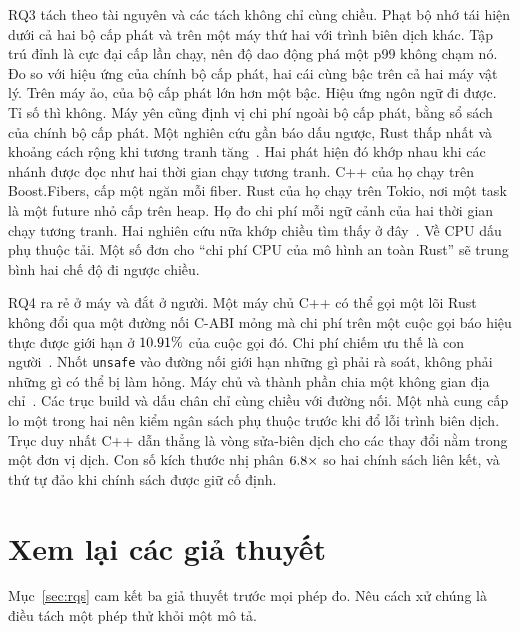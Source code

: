 RQ3 tách theo tài nguyên và các tách không chỉ cùng chiều. Phạt bộ nhớ tái hiện dưới cả hai bộ
cấp phát và trên một máy thứ hai với trình biên dịch khác. Tập trú đỉnh là cực đại cấp lần chạy,
nên độ dao động phá một p99 không chạm nó. Đo so với hiệu ứng của chính bộ cấp phát, hai cái
cùng bậc trên cả hai máy vật lý. Trên máy ảo, của bộ cấp phát lớn hơn một bậc. Hiệu ứng ngôn
ngữ đi được. Tỉ số thì không. Máy yên cũng định vị chi phí ngoài bộ cấp phát, bằng sổ sách của
chính bộ cấp phát. Một nghiên cứu gần báo dấu ngược, Rust thấp nhất và khoảng cách rộng khi
tương tranh tăng~\cite{karlback2021ran}. Hai phát hiện đó khớp nhau khi các nhánh được đọc như
hai thời gian chạy tương tranh. C++ của họ chạy trên Boost.Fibers, cấp một ngăn mỗi fiber. Rust
của họ chạy trên Tokio, nơi một task là một future nhỏ cấp trên heap. Họ đo chi phí mỗi ngữ cảnh
của hai thời gian chạy tương tranh. Hai nghiên cứu nữa khớp chiều tìm thấy ở
đây~\cite{olsson2023ranmgmt,sundvisson2026drivers}. Về CPU dấu phụ thuộc tải. Một số đơn cho
``chi phí CPU của mô hình an toàn Rust'' sẽ trung bình hai chế độ đi ngược chiều.

RQ4 ra rẻ ở máy và đắt ở người. Một máy chủ C++ có thể gọi một lõi Rust không đổi qua một đường
nối C-ABI mỏng mà chi phí trên một cuộc gọi báo hiệu thực được giới hạn ở $10.91\%$ của
cuộc gọi đó. Chi phí chiếm ưu thế là con người~\cite{fulton2021adopting,crichton2024learning}. Nhốt
\texttt{unsafe} vào đường nối giới hạn những gì phải rà soát, không phải những gì có thể bị làm
hỏng. Máy chủ và thành phần chia một không gian địa
chỉ~\cite{rivera2021galeed,kirth2022pkrusafe}. Các trục build và dấu chân chỉ cùng chiều với
đường nối. Một nhà cung cấp lo một trong hai nên kiểm ngân sách phụ thuộc trước khi đổ lỗi trình
biên dịch. Trục duy nhất C++ dẫn thẳng là vòng sửa-biên dịch cho các thay đổi nằm trong một đơn
vị dịch. Con số kích thước nhị phân $6.8\times$ so hai chính sách liên kết, và thứ
tự đảo khi chính sách được giữ cố định.

\section{Xem lại các giả thuyết}\label{sec:hypotheses}
Mục~\ref{sec:rqs} cam kết ba giả thuyết trước mọi phép đo. Nêu cách xử chúng là điều tách một
phép thử khỏi một mô tả.

